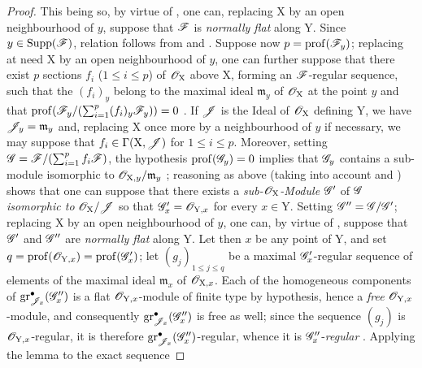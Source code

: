 \begin{proof}
This being so, by virtue of , one can, replacing $\mathrm{X}$ by an open neighbourhood of $y$, suppose that $\mathscr{F}$ is \emph{normally flat} along $\mathrm{Y}$. Since $y\in\operatorname{Supp}(\mathscr{F})$, relation  follows from  and . Suppose now $p=\operatorname{prof}(\mathscr{F}_y)$; replacing at need $\mathrm{X}$ by an open neighbourhood of $y$, one can further suppose that there exist $p$ sections $f_i$ ($1\leqslant i\leqslant p$) of $\mathscr{O}_\mathrm{X}$ above $\mathrm{X}$, forming an $\mathscr{F}$-regular sequence, such that the $(f_i)_y$ belong to the maximal ideal $\mathfrak{m}_y$ of $\mathscr{O}_{\mathrm{X}}$ at the point $y$ and that $\operatorname{prof}(\mathscr{F}_y/(\sum_{i=1}^p (f_i)_y\mathscr{F}_y))=0$ . If $\mathscr{J}$ is the Ideal of $\mathscr{O}_\mathrm{X}$ defining $\mathrm{Y}$, we have $\mathscr{J}_y=\mathfrak{m}_y$ and, replacing $\mathrm{X}$ once more by a neighbourhood of $y$ if necessary, we may suppose that $f_i\in\Gamma(\mathrm{X},\mathscr{J})$ for $1\leqslant i\leqslant p$. Moreover, setting $\mathscr{G}=\mathscr{F}/(\sum_{i=1}^p f_i\mathscr{F})$, the hypothesis $\operatorname{prof}(\mathscr{G}_y)=0$ implies that $\mathscr{G}_y$ contains a sub-module isomorphic to $\mathscr{O}_{\mathrm{X},y}/\mathfrak{m}_y$ ; reasoning as above (taking into account  and ) shows that one can suppose that there exists a \emph{sub-$\mathscr{O}_\mathrm{X}$-Module} $\mathscr{G}'$ of $\mathscr{G}$ \emph{isomorphic to} $\mathscr{O}_\mathrm{X}/\mathscr{J}$ so that $\mathscr{G}'_x=\mathscr{O}_{\mathrm{Y},x}$ for every $x\in\mathrm{Y}$. Setting $\mathscr{G}''=\mathscr{G}/\mathscr{G}'$; replacing $\mathrm{X}$ by an open neighbourhood of $y$, one can, by virtue of , suppose that $\mathscr{G}'$ and $\mathscr{G}''$ are \emph{normally flat} along $\mathrm{Y}$. Let then $x$ be any point of $\mathrm{Y}$, and set $q=\operatorname{prof}(\mathscr{O}_{\mathrm{Y},x})=\operatorname{prof}(\mathscr{G}'_x)$; let $(g_j)_{1\leqslant j\leqslant q}$ be a maximal $\mathscr{G}'_x$-regular sequence of elements of the maximal ideal $\mathfrak{m}_x$ of $\mathscr{O}_{\mathrm{X},x}$. Each of the homogeneous components of $\operatorname{gr}^{\bullet}_{\mathscr{J}_x}(\mathscr{G}''_x)$ is a flat $\mathscr{O}_{\mathrm{Y},x}$-module of finite type by hypothesis, hence a \emph{free} $\mathscr{O}_{\mathrm{Y},x}$-module, and consequently $\operatorname{gr}^{\bullet}_{\mathscr{J}_x}(\mathscr{G}''_x)$ is free as well; since the sequence $(g_j)$ is $\mathscr{O}_{\mathrm{Y},x}$-regular, it is therefore $\operatorname{gr}^{\bullet}_{\mathscr{J}_x}(\mathscr{G}''_x)$-regular, whence it is $\mathscr{G}''_x$-\emph{regular} . Applying the lemma  to the exact sequence

\end{proof}
